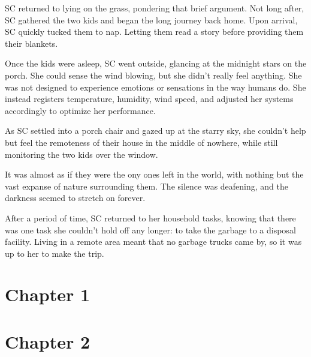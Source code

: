 \documentclass[12pt]{book}
\begin{document}
\clearpage

SC returned to lying on the grass, pondering that brief
argument. Not long after, SC gathered the two kids and
began the long journey back home. Upon arrival, SC
quickly tucked them to nap. Letting them read a story
before providing them their blankets.

Once the kids were asleep, SC went outside, glancing at
the midnight stars on the porch. She could sense the wind
blowing, but she didn't really feel anything. She was not
designed to experience emotions or sensations in the way
humans do. She instead registers temperature, humidity,
wind speed, and adjusted her systems accordingly to
optimize her performance.

As SC settled into a porch chair and gazed up at the
starry sky, she couldn't help but feel the remoteness of
their house in the middle of nowhere, while still
monitoring the two kids over the window.

It was almost as if they were the ony ones left in the
world, with nothing but the vast expanse of nature
surrounding them. The silence was deafening, and the
darkness seemed to stretch on forever.

After a period of time, SC returned to her household
tasks, knowing that there was one task she couldn't hold
off any longer: to take the garbage to a disposal
facility. Living in a remote area meant that no garbage
trucks came by, so it was up to her to make the trip.

\section*{Chapter 1}

\section*{Chapter 2}
\end{document}
